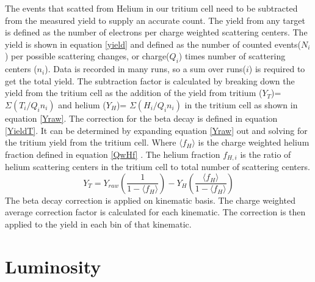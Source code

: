 The events that scatted from Helium in our tritium cell need to be subtracted from the measured yield to supply an accurate count. The yield from any target is defined as the number of electrons per charge weighted scattering centers. The yield is shown in equation \ref{yield} and defined as the number of counted events($N_i$) per possible scattering changes, or charge($Q_i$) times number of scattering centers ($n_i$). Data is recorded in many runs, so a sum over runs($i$) is required to get the total yield. The subtraction factor is calculated by breaking down the yield from the tritium cell as the addition of the yield from tritium ($Y_T$)= $\Sigma(T_i/Q_in_{i})$ and helium ($Y_H$)= $\Sigma(H_i/Q_in_{i})$ in the tritium cell as shown in equation \ref{Yraw}. The correction for the beta decay is defined in equation \ref{YieldT}. It can be determined by expanding equation \ref{Yraw} out and solving for the tritium yield from the tritium cell. Where $\langle f_H \rangle$ is the charge weighted helium fraction defined in equation \ref{QwHf} \cite{primer}. The helium fraction $f_{H,i}$ is the ratio of helium scattering centers in the tritium cell to total number of scattering centers. 
\begin{equation}
Y_T = Y_{raw}\left(\frac{1}{1-\langle f_H \rangle}\right) - Y_H \left(\frac{\langle f_H \rangle}{1-\langle f_H \rangle}\right) \label{YieldT}
\end{equation}
The beta decay correction is applied on kinematic basis. The charge weighted average correction factor is calculated for each kinematic. The correction is then applied to the yield in each bin of that kinematic. 


\section{Luminosity}
